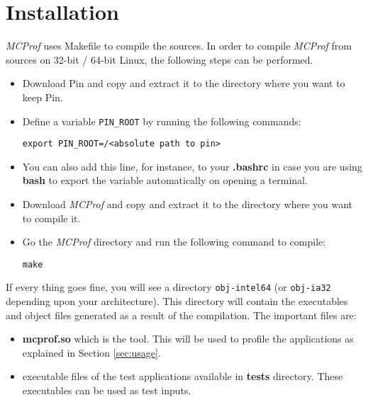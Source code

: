 \documentclass[11pt]{article}
\newcommand{\MCPROF}{\emph{MCProf}}
\begin{document}
\section{Installation}
\label{sec:installation}

\MCPROF{} uses Makefile to compile the sources. In order to compile \MCPROF{} from
sources on 32-bit / 64-bit Linux, the following steps can be performed.

\begin{itemize}

\item Download Pin and copy and extract it to the directory where you want to keep Pin.

\item Define a variable \verb|PIN_ROOT| by running the following commands:
        \begin{center}
        \verb|export PIN_ROOT=/<absolute path to pin>|
        \end{center}

\item You can also add this line, for instance, to your \textbf{.bashrc} in case you are
using \textbf{bash} to export the variable automatically on opening a terminal.

\item Download \MCPROF{} and copy and extract it to the directory where you want to compile it.

\item Go the \MCPROF{} directory and run the following command to compile:
        \begin{center}
        \verb|make|
        \end{center}

\end{itemize}

If every thing goes fine, you will see a directory \verb|obj-intel64| (or \verb|obj-ia32|
depending upon your architecture). This directory will contain the executables and
object files generated as a result of the compilation. The important files are:

\begin{itemize}
\item \textbf{mcprof.so} which is the tool. This will be used to profile the
applications as explained in Section \ref{sec:usage}.
\item executable files of the test applications available in \textbf{tests} directory.
These executables can be used as test inputs.
\end{itemize}
\end{document}

